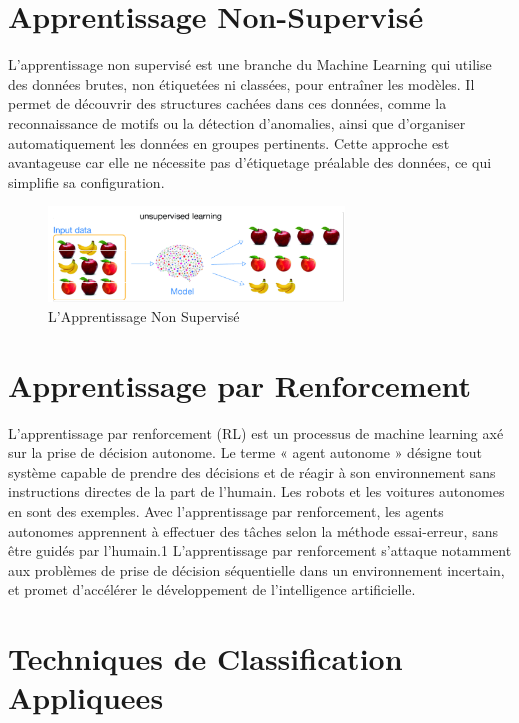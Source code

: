 \section{Apprentissage Non-Supervisé}
\label{sec:non-supervise}
L'apprentissage non supervisé est une branche du Machine Learning qui utilise des données brutes, non étiquetées ni classées, pour entraîner les modèles. Il permet de découvrir des structures cachées dans ces données, comme la reconnaissance de motifs
ou la détection d'anomalies, ainsi que d'organiser automatiquement les données en groupes pertinents. Cette approche est avantageuse car elle ne nécessite pas d'étiquetage préalable des données, ce qui simplifie sa configuration.

\begin{figure}[h]
    \centering
    \includegraphics[width=0.7\textwidth]{rapport/Imag/2020-10-28-10_41_58-Machine-Learning-vs-Human-Decision-Making.png} 
    \caption{L'Apprentissage Non Supervisé}
    \label{fig:mon_image}
\end{figure}


\section{Apprentissage par Renforcement}
\label{sec:renforcement}
L’apprentissage par renforcement (RL) est un processus de machine learning axé sur la prise de décision autonome. Le terme « agent autonome » désigne tout système capable de prendre des décisions et de réagir à son environnement sans instructions directes de la part de l’humain. Les robots et les voitures autonomes en sont des exemples. Avec l’apprentissage par renforcement, les agents autonomes apprennent à effectuer des tâches selon la méthode essai-erreur, sans être guidés par l’humain.1 L’apprentissage par renforcement s’attaque notamment aux problèmes de prise de décision séquentielle dans un environnement incertain, et promet d’accélérer le développement de l’intelligence artificielle.

\section{Techniques de Classification Appliquees}
\label{sec:Techniques}

